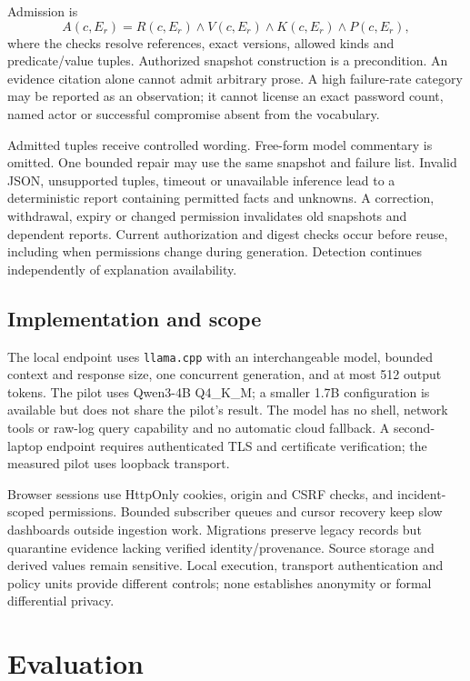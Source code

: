 \documentclass[conference,letterpaper]{IEEEtran}
\begin{document}
Admission is
\begin{equation}
A(c,E_r)=R(c,E_r)\land V(c,E_r)\land K(c,E_r)\land P(c,E_r),
\label{eq:admit}
\end{equation}
where the checks resolve references, exact versions, allowed kinds and predicate/value tuples. Authorized snapshot construction is a precondition. An evidence citation alone cannot admit arbitrary prose. A high failure-rate category may be reported as an observation; it cannot license an exact password count, named actor or successful compromise absent from the vocabulary.

Admitted tuples receive controlled wording. Free-form model commentary is omitted. One bounded repair may use the same snapshot and failure list. Invalid JSON, unsupported tuples, timeout or unavailable inference lead to a deterministic report containing permitted facts and unknowns. A correction, withdrawal, expiry or changed permission invalidates old snapshots and dependent reports. Current authorization and digest checks occur before reuse, including when permissions change during generation. Detection continues independently of explanation availability.

\subsection{Implementation and scope}
The local endpoint uses \texttt{llama.cpp} with an interchangeable model, bounded context and response size, one concurrent generation, and at most 512 output tokens. The pilot uses Qwen3-4B Q4\_K\_M; a smaller 1.7B configuration is available but does not share the pilot's result. The model has no shell, network tools or raw-log query capability and no automatic cloud fallback. A second-laptop endpoint requires authenticated TLS and certificate verification; the measured pilot uses loopback transport.

Browser sessions use HttpOnly cookies, origin and CSRF checks, and incident-scoped permissions. Bounded subscriber queues and cursor recovery keep slow dashboards outside ingestion work. Migrations preserve legacy records but quarantine evidence lacking verified identity/provenance. Source storage and derived values remain sensitive. Local execution, transport authentication and policy units provide different controls; none establishes anonymity or formal differential privacy.


\section{Evaluation}
\end{document}
